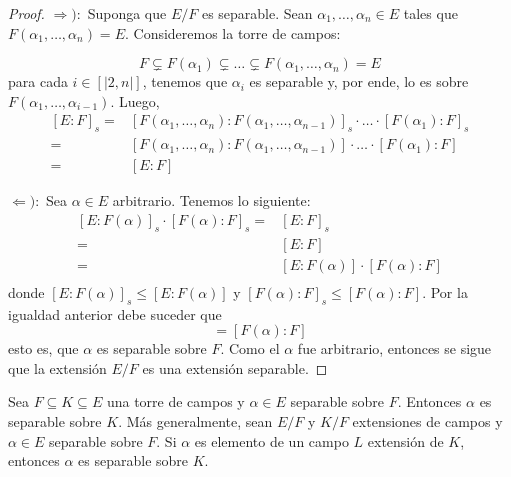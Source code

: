 \documentclass[12pt]{report}
\newcommand{\natint}[1]{\ensuremath{\left[\big|#1\big|\right]}}
\theoremstyle{largebreak}
\begin{document}
    \begin{proof}
        $\Rightarrow):$ Suponga que $E/F$ es separable. Sean $\alpha_1,\dots,\alpha_n\in E$ tales que $F(\alpha_1,\dots,\alpha_n)=E$. Consideremos la torre de campos:
        
        \begin{equation*}
            F\subsetneq F(\alpha_1)\subsetneq\dots\subsetneq F(\alpha_1,\dots,\alpha_n)=E
        \end{equation*}
        para cada $i\in\natint{2,n}$, tenemos que $\alpha_i$ es separable y, por ende, lo es sobre $F(\alpha_1,\dots,\alpha_{i-1})$. Luego,
        \begin{equation*}
            \begin{split}
                [E:F]_s=&[F(\alpha_1,\dots,\alpha_n):F(\alpha_1,\dots,\alpha_{n-1})]_s\cdot\dots\cdot[F(\alpha_1):F]_s\\
                =&[F(\alpha_1,\dots,\alpha_n):F(\alpha_1,\dots,\alpha_{n-1})]\cdot\dots\cdot[F(\alpha_1):F]\\
                =&[E:F]
            \end{split}
        \end{equation*}

        $\Leftarrow):$ Sea $\alpha\in E$ arbitrario. Tenemos lo siguiente:
        \begin{equation*}
            \begin{split}
                [E:F(\alpha)]_s\cdot[F(\alpha):F]_s=&[E:F]_s\\
                =&[E:F]\\
                =&[E:F(\alpha)]\cdot[F(\alpha):F]\\
            \end{split}
        \end{equation*}
        donde $[E:F(\alpha)]_s\leq [E:F(\alpha)]$ y $[F(\alpha):F]_s\leq [F(\alpha):F]$. Por la igualdad anterior debe suceder que
        \begin{equation*}
            [F(\alpha):F]=[F(\alpha):F]
        \end{equation*}
        esto es, que $\alpha$ es separable sobre $F$. Como el $\alpha$ fue arbitrario, entonces se sigue que la extensión $E/F$ es una extensión separable.

    \end{proof}

    \begin{obs}
        Sea $F\subseteq K \subseteq E$ una torre de campos y $\alpha\in E$ separable sobre $F$. Entonces $\alpha$ es separable sobre $K$. Más generalmente, sean $E/F$ y $K/F$ extensiones de campos y $\alpha\in E$ separable sobre $F$. Si $\alpha$ es elemento de un campo $L$ extensión de $K$, entonces $\alpha$ es separable sobre $K$.
    \end{obs}
\end{document}
